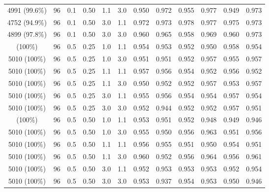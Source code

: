 \begin{longtable}[t]{ccccccrrrrrr}
4991 (99.6\%) & 96 & 0.1 & 0.50 & 1.1 & 3.0 & 0.950 & 0.972 & 0.955 & 0.977 & 0.949 & 0.973\\
4752 (94.9\%) & 96 & 0.1 & 0.50 & 3.0 & 1.1 & 0.972 & 0.973 & 0.978 & 0.977 & 0.975 & 0.973\\
4899 (97.8\%) & 96 & 0.1 & 0.50 & 3.0 & 3.0 & 0.960 & 0.965 & 0.958 & 0.969 & 0.960 & 0.973\\
\addlinespace
5010 (100\%) & 96 & 0.5 & 0.25 & 1.0 & 1.1 & 0.954 & 0.953 & 0.952 & 0.950 & 0.958 & 0.954\\
5010 (100\%) & 96 & 0.5 & 0.25 & 1.0 & 3.0 & 0.951 & 0.951 & 0.952 & 0.957 & 0.955 & 0.957\\
5010 (100\%) & 96 & 0.5 & 0.25 & 1.1 & 1.1 & 0.957 & 0.956 & 0.954 & 0.952 & 0.956 & 0.952\\
5010 (100\%) & 96 & 0.5 & 0.25 & 1.1 & 3.0 & 0.950 & 0.952 & 0.952 & 0.957 & 0.953 & 0.957\\
5010 (100\%) & 96 & 0.5 & 0.25 & 3.0 & 1.1 & 0.955 & 0.956 & 0.954 & 0.954 & 0.957 & 0.954\\
5010 (100\%) & 96 & 0.5 & 0.25 & 3.0 & 3.0 & 0.952 & 0.944 & 0.952 & 0.952 & 0.957 & 0.951\\
\addlinespace
5010 (100\%) & 96 & 0.5 & 0.50 & 1.0 & 1.1 & 0.953 & 0.951 & 0.952 & 0.948 & 0.949 & 0.946\\
5010 (100\%) & 96 & 0.5 & 0.50 & 1.0 & 3.0 & 0.955 & 0.950 & 0.956 & 0.963 & 0.951 & 0.956\\
5010 (100\%) & 96 & 0.5 & 0.50 & 1.1 & 1.1 & 0.956 & 0.955 & 0.951 & 0.950 & 0.954 & 0.951\\
5010 (100\%) & 96 & 0.5 & 0.50 & 1.1 & 3.0 & 0.960 & 0.952 & 0.956 & 0.964 & 0.956 & 0.961\\
5010 (100\%) & 96 & 0.5 & 0.50 & 3.0 & 1.1 & 0.952 & 0.953 & 0.953 & 0.953 & 0.952 & 0.954\\
5010 (100\%) & 96 & 0.5 & 0.50 & 3.0 & 3.0 & 0.953 & 0.937 & 0.954 & 0.953 & 0.950 & 0.946\\
\bottomrule
\end{longtable}
\endgroup{}
